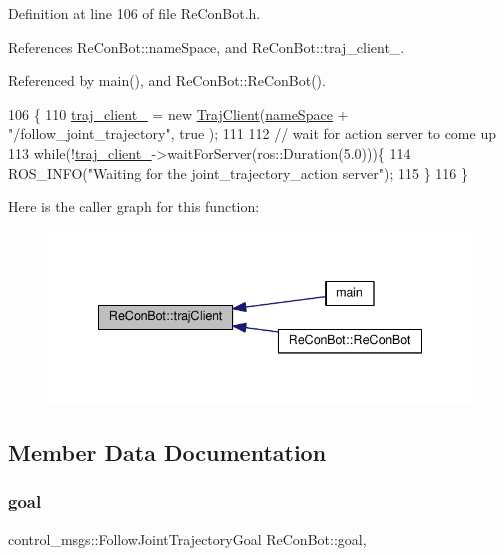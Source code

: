 Definition at line 106 of file Re\+Con\+Bot.\+h.



References Re\+Con\+Bot\+::name\+Space, and Re\+Con\+Bot\+::traj\+\_\+client\+\_\+.



Referenced by main(), and Re\+Con\+Bot\+::\+Re\+Con\+Bot().


\begin{DoxyCode}
106                          \{
110   \hyperlink{class_re_con_bot_a14a35ad6ca284af7db7228d7872720d1}{traj\_client\_} = \textcolor{keyword}{new} \hyperlink{_re_con_bot_8h_a6fb8875093261cdc69e54d3ac7d5c301}{TrajClient}(\hyperlink{class_re_con_bot_a40ca07cd606988b78664c4a52fd8dc59}{nameSpace} + \textcolor{stringliteral}{"/follow\_joint\_trajectory"}, \textcolor{keyword}{true}
      );
111 
112   \textcolor{comment}{// wait for action server to come up}
113   \textcolor{keywordflow}{while}(!\hyperlink{class_re_con_bot_a14a35ad6ca284af7db7228d7872720d1}{traj\_client\_}->waitForServer(ros::Duration(5.0)))\{
114   ROS\_INFO(\textcolor{stringliteral}{"Waiting for the joint\_trajectory\_action server"});
115   \}
116 \}
\end{DoxyCode}
Here is the caller graph for this function\+:
\nopagebreak
\begin{figure}[H]
\begin{center}
\leavevmode
\includegraphics[width=338pt]{d9/d0b/class_re_con_bot_ab859fa96532995d3c1545aaa9db1802e_icgraph}
\end{center}
\end{figure}


\subsection{Member Data Documentation}
\mbox{\label{class_re_con_bot_a9bd1c7ddf2376e2e68ea5d8bd8c3f505}} 
\subsubsection{\texorpdfstring{goal}{goal}}
{\footnotesize\ttfamily control\+\_\+msgs\+::\+Follow\+Joint\+Trajectory\+Goal Re\+Con\+Bot\+::goal\hspace{0.3cm}{\ttfamily [protected]}, {\ttfamily [inherited]}}



